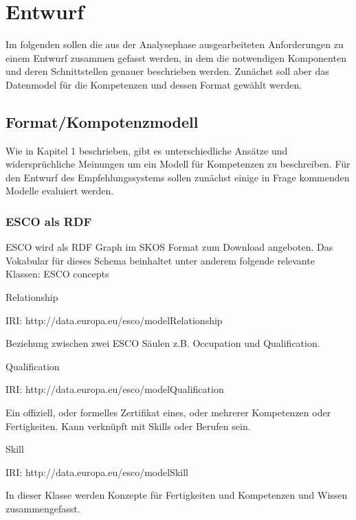 \section{Entwurf}\label{entwurf}

Im folgenden sollen die aus der Analysephase  ausgearbeiteten Anforderungen zu einem Entwurf zusammen gefasst werden, in dem die notwendigen Komponenten und deren Schnittstellen genauer beschrieben werden. Zunächst soll aber das Datenmodel für die Kompetenzen und dessen Format gewählt werden.

\subsection{Format/Kompotenzmodell}

Wie in Kapitel 1 beschrieben, gibt es unterschiedliche Ansätze und widersprüchliche Meinungen um ein Modell für Kompetenzen zu beschreiben. Für den Entwurf des Empfehlungssystems sollen zunächst einige in Frage kommenden Modelle evaluiert werden. 

\subsubsection{ESCO als RDF}

ESCO wird als RDF Graph im SKOS Format zum Download angeboten. Das Vokabular\cite{esco_ontology} für dieses Schema beinhaltet unter anderem folgende relevante Klassen: 
\vspace{1em}
ESCO concepts \newline

Relationship

IRI: http://data.europa.eu/esco/modelRelationship

Beziehung zwischen zwei ESCO Säulen z.B. Occupation und Qualification.\newline

Qualification 

IRI: http://data.europa.eu/esco/modelQualification

Ein offiziell, oder formelles Zertifikat eines, oder mehrerer Kompetenzen oder Fertigkeiten. Kann verknüpft mit Skills oder Berufen sein.\newline

Skill 

IRI: http://data.europa.eu/esco/modelSkill

In dieser Klasse werden Konzepte für Fertigkeiten und Kompetenzen und Wissen zusammengefasst.\newline

